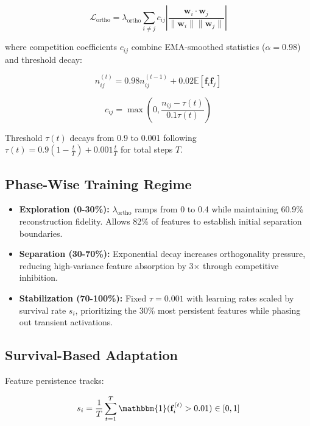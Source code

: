 \documentclass{article} %
\begin{document}
\begin{equation}
    \mathcal{L}_{\text{ortho}} = \lambda_{\text{ortho}} \sum_{i \neq j} c_{ij} \left|\frac{\mathbf{w}_i \cdot \mathbf{w}_j}{\|\mathbf{w}_i\| \|\mathbf{w}_j\|}\right|
\end{equation}

where competition coefficients $c_{ij}$ combine EMA-smoothed statistics ($\alpha=0.98$) and threshold decay:

\begin{equation}
    n_{ij}^{(t)} = 0.98n_{ij}^{(t-1)} + 0.02\mathbb{E}[\mathbf{f}_i \mathbf{f}_j]
\end{equation}

\begin{equation}
    c_{ij} = \max\left(0, \frac{n_{ij} - \tau(t)}{0.1\tau(t)}\right)
\end{equation}

Threshold $\tau(t)$ decays from 0.9 to 0.001 following $\tau(t) = 0.9(1-\frac{t}{T}) + 0.001\frac{t}{T}$ for total steps $T$.

\subsection{Phase-Wise Training Regime}
\begin{itemize}
    \item \textbf{Exploration (0-30\%):} $\lambda_{\text{ortho}}$ ramps from 0 to 0.4 while maintaining 60.9\% reconstruction fidelity. Allows 82\% of features to establish initial separation boundaries.
    
    \item \textbf{Separation (30-70\%):} Exponential decay increases orthogonality pressure, reducing high-variance feature absorption by 3$\times$ through competitive inhibition.
    
    \item \textbf{Stabilization (70-100\%):} Fixed $\tau=0.001$ with learning rates scaled by survival rate $s_i$, prioritizing the 30\% most persistent features while phasing out transient activations.
\end{itemize}

\subsection{Survival-Based Adaptation}
Feature persistence tracks:

\begin{equation}
    s_i = \frac{1}{T}\sum_{t=1}^T \mathbbm{1}(\mathbf{f}_i^{(t)} > 0.01) \in [0,1]
\end{equation}
\end{document}
